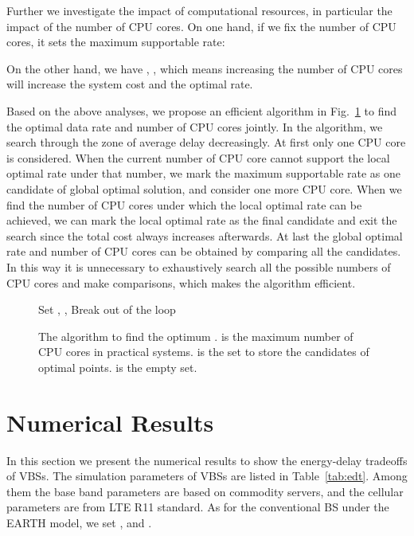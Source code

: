 \documentclass[conference]{IEEEtran}
\begin{document}
Further we investigate the impact of computational resources, in particular
the impact of the number of CPU cores.
On one hand, if we fix the number of CPU cores, it sets the maximum supportable
rate:

On the other hand, we have
,
,
which means increasing the number of CPU cores
will increase the system cost and the optimal rate.

Based on the above analyses, we propose an efficient algorithm in
Fig.~\ref{fig:alg-pair} to find the optimal data rate and
number of CPU cores  jointly.
In the algorithm, we search through the zone of average delay decreasingly.
At first only one CPU core is considered.
When the current number of CPU core cannot support the local optimal rate under
that number, we mark the maximum supportable rate as one candidate of
global optimal solution, and consider one more CPU core.
When we find the number of CPU cores under which the local optimal rate
can be achieved,
we can mark the local optimal rate as the final candidate and exit the search
since the total cost always increases afterwards.
At last the global optimal rate and number of CPU cores
can be obtained by comparing all the candidates.
In this way it is unnecessary to exhaustively search all the possible numbers of CPU cores and make comparisons, which makes the algorithm efficient.

\begin{figure}[!t]
  \centering
  \begin{algorithmic}[1]
    \STATE Set , , 
    \WHILE{}
    \STATE 
    \IF{}
    \STATE 
    \STATE Break out of the loop
    \ELSE
    \STATE 
    \STATE 
    \ENDIF
    \ENDWHILE
    \RETURN 
  \end{algorithmic}
  \caption{The algorithm to find the optimum .
   is the maximum number of CPU cores in practical systems.
   is the set to store the candidates of optimal points.
   is the empty set.}
  \label{fig:alg-pair}
\end{figure}

\section{Numerical Results}
\label{sec:num}

In this section we present the
numerical results to show the energy-delay tradeoffs of VBSs.
The simulation parameters of VBSs are listed in Table~\ref{tab:edt}.
Among them the base band parameters are based on commodity servers, and
the cellular parameters are from LTE R11 standard.
As for the conventional BS under the EARTH model, we set
,
and .
\end{document}
